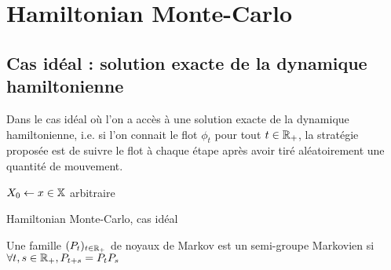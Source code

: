 \documentclass[10pt,a4paper]{article}
\begin{document}

\section{Hamiltonian Monte-Carlo}

\subsection{Cas idéal : solution exacte de la dynamique hamiltonienne}

Dans le cas idéal où l'on a accès à une solution exacte de la dynamique hamiltonienne, i.e. si l'on connait le flot $\phi_t$ pour tout $t \in \mathbb{R}_+$, la stratégie proposée est de suivre le flot à chaque étape après avoir tiré aléatoirement une quantité de mouvement.

\begin{center}
	\begin{algorithm}[H]
		$X_0 \leftarrow x \in \mathbb{X}$ arbitraire\;
		\caption{Hamiltonian Monte-Carlo, cas idéal}
		\label{algo:HMC-ideal}
	\end{algorithm}
\end{center}

\begin{Def}
	Une famille $(P_t)_{t \in \mathbb{R}_+}$ de noyaux de Markov est un semi-groupe Markovien si $\forall t,s \in \mathbb{R}_+, P_{t+s} = P_t P_s$
\end{Def}
\end{document}
